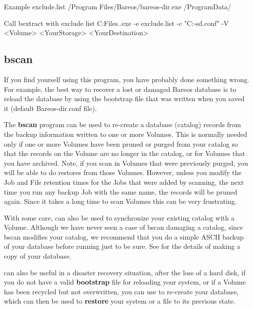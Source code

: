 \begin{config}{Example exclude.list}
/Program Files/Bareos/bareos-dir.exe
/ProgramData/
\end{config}

\begin{commands}{Call bextract with exclude list}
C:\Program Files\Bareos .\bextract.exe -e exclude.list -c "C:\ProgrammData\Bareos\bareos-sd.conf" -V <Volume> <YourStorage> <YourDestination>
\end{commands}


\subsection{bscan}
\label{bscan}

If you find yourself using this program, you have probably done something
wrong. For example, the best way to recover a lost or damaged Bareos
database is to reload the database by using the bootstrap file that
was written when you saved it (default Bareos-dir.conf file).

The {\bf bscan} program can be used to re-create a database (catalog)
records from the backup information written to one or more Volumes.  This
is normally needed only if one or more Volumes have been pruned or purged
from your catalog so that the records on the Volume are no longer in the
catalog, or for Volumes that you have archived.  Note, if you scan in
Volumes that were previously purged, you will be able to do restores from
those Volumes.  However, unless you modify the Job and File retention times
for the Jobs that were added by scanning, the next time you run any backup Job
with the same name, the records will be pruned again.  Since it takes a
long time to scan Volumes this can be very frustrating.

With some care,  can also be used to synchronize your existing
catalog with a Volume.  Although we have never seen a case of bscan
damaging a catalog, since bscan modifies your catalog, we recommend that
you do a simple ASCII backup of your database before running 
just to be sure.  See  for
the details of making a copy of your database.

 can also be useful in a disaster recovery situation, after the
loss of a hard disk, if you do not have a valid {\bf bootstrap} file for
reloading your system, or if a Volume has been recycled but not overwritten,
you can use  to re-create your database, which can then be used to
{\bf restore} your system or a file to its previous state.

